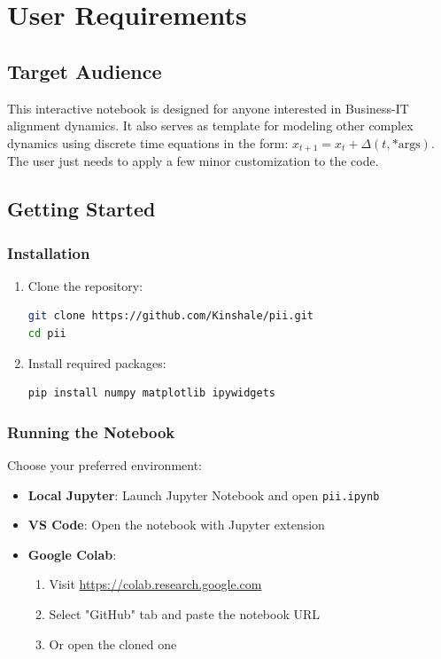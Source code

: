 \documentclass[a4paper, 10pt]{article}
\begin{document}
\section{User Requirements}
\subsection{Target Audience}
This interactive notebook is designed for anyone interested in Business-IT alignment dynamics.
It also serves as template for modeling other complex dynamics using discrete time equations in the form: $x_{t+1} = x_t + \Delta(t, \text{*args})$. The user just needs to apply a few minor customization to the code.

\subsection{Getting Started}
\subsubsection{Installation}
\begin{enumerate}
	\item Clone the repository:
	\begin{lstlisting}[language=bash]
git clone https://github.com/Kinshale/pii.git
cd pii
    \end{lstlisting}

	\item Install required packages:
	\begin{lstlisting}[language=bash]
pip install numpy matplotlib ipywidgets
    \end{lstlisting}
\end{enumerate}

\subsubsection{Running the Notebook}
Choose your preferred environment:
\begin{itemize}
	\item \textbf{Local Jupyter}: Launch Jupyter Notebook and open \texttt{pii.ipynb}
	\item \textbf{VS Code}: Open the notebook with Jupyter extension
	\item \textbf{Google Colab}:
	      \begin{enumerate}
		      \item Visit \url{https://colab.research.google.com}
		      \item Select "GitHub" tab and paste the notebook URL
		      \item Or open the cloned one
	      \end{enumerate}
\end{itemize}
\end{document}
